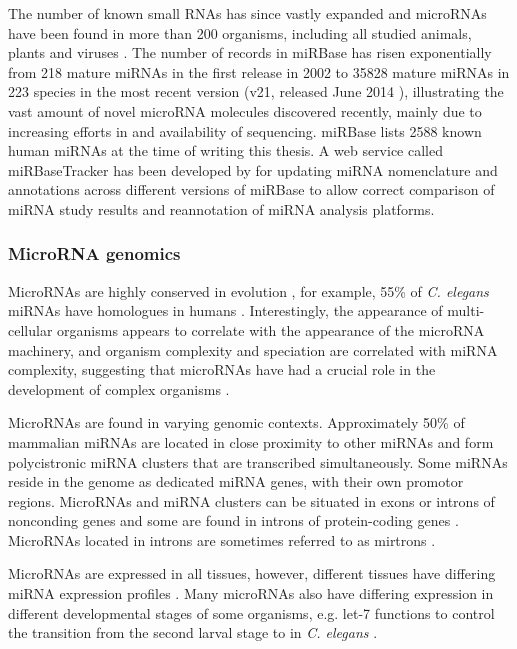 The number of known small RNAs has since vastly expanded
and microRNAs have been found in more than 200 organisms, including
all studied animals, plants \citep{JonesRhoades2006} and viruses \citep{Grundhoff2011}. 
The number of records in miRBase has risen exponentially
from %
218 mature miRNAs in the first release in 2002 to %
35828 mature miRNAs in 223 species in the most recent version (v21, released June
2014 \citep{VanPeer2014,MiRBaseWeb}), illustrating the vast amount of novel
microRNA molecules discovered recently, mainly due to increasing efforts in
and availability of sequencing. miRBase lists 2588 known human miRNAs at the
time of writing this thesis. A web service called miRBaseTracker has been
developed by \citet{VanPeer2014} for updating miRNA nomenclature and
annotations across different versions of miRBase to allow correct comparison
of miRNA study results and reannotation of miRNA analysis platforms.



\subsubsection{MicroRNA genomics}\label{microrna-genomics}

MicroRNAs are highly conserved in evolution \citep{Bartel2004}, for example,
55\% of \emph{C. elegans} miRNAs have homologues in humans
\citep{IbanezVentoso2008}. Interestingly, the
appearance of multi-cellular organisms appears to correlate with the
appearance of the microRNA machinery, and organism complexity and speciation
are correlated with miRNA complexity, suggesting that microRNAs have had a
crucial role in the development of complex organisms \citep{Lee2007}.

MicroRNAs are found in varying genomic contexts. Approximately 50\% of
mammalian miRNAs are located in close proximity to other miRNAs and form
polycistronic miRNA clusters that are transcribed simultaneously. Some miRNAs
reside in the genome as dedicated miRNA genes, with their own promotor regions.
\citep{Kim2009} MicroRNAs and miRNA clusters can be situated in exons or
introns of nonconding genes and some are found in introns of protein-coding genes
\citep{Du2005}. MicroRNAs located in introns are sometimes referred to as
mirtrons \citep{Ruby2007}.

MicroRNAs are expressed in all tissues, however, different tissues
have differing miRNA expression profiles \citep{Krol2010}. Many microRNAs also
have differing expression in different developmental stages
of some organisms, e.g. let-7 functions to control the transition
from the second larval stage to in \emph{C. elegans} \citep{Bartel2004}.

